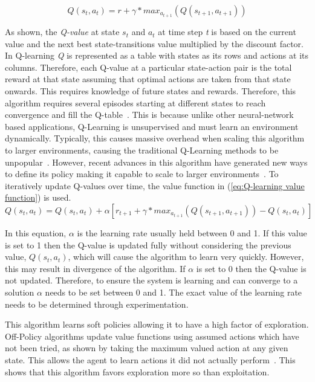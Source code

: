 \documentclass[12pt,american]{report}
\begin{document}
        \begin{equation}
            \label{eq:bellman}
            Q(s_{t},a_{t}) = r + \gamma*max_{a_{t+1} }(Q(s_{t+1},a_{t+1}))
        \end{equation}
        
        As shown, the \textit{Q-value} at state \textit{$s_t$} and \textit{$a_t$} at time step \textit{t} is based on the current value and the next best state-transitions value multiplied by the discount factor. In Q-learning \textit{Q} is represented as a table with states as its rows and actions at its columns.  Therefore, each Q-value at a particular state-action pair is the total reward at that state assuming that optimal actions are taken from that state onwards.  This requires knowledge of future states and rewards.  Therefore, this algorithm requires several episodes starting at different states to reach convergence and fill the Q-table~\cite{Watkins:1992}. This is because unlike other neural-network based applications, Q-Learning is unsupervised and must learn an environment dynamically. Typically, this causes massive overhead when scaling this algorithm to larger environments, causing the traditional Q-Learning methods to be unpopular~\cite{peng2015mobile}.  However, recent advances in this algorithm have generated new ways to define its policy making it capable to scale to larger environments~\cite{Greedy}. To iteratively update Q-values over time, the value function in (\ref{eq:Q-learning value function}) is used. 
        \begin{equation}
            \label{eq:Q-learning value function}
            Q(s_{t},a_{t}) = Q(s_{t},a_{t}) + \alpha[r_{t+1} + \gamma*max_{a_{t+1} }(Q(s_{t+1},a_{t+1}))-Q(s_{t},a_{t})]
        \end{equation}
        
        In this equation, \textit{$\alpha$} is the learning rate usually held between 0 and 1.  If this value is set to 1 then the Q-value is updated fully without considering the previous value, \textit{$Q(s_t,a_t)$}, which will cause the algorithm to learn very quickly. However, this may result in divergence of the algorithm.  If \textit{$\alpha$} is set to 0 then the Q-value is not updated.  Therefore, to ensure the system is learning and can converge to a solution \textit{$\alpha$} needs to be set between 0 and 1. The exact value of the learning rate needs to be determined through experimentation.
        
        This algorithm learns soft policies allowing it to have a high factor of exploration. Off-Policy algorithms update value functions using assumed actions which have not been tried, as shown by taking the maximum valued action at any given state.  This allows the agent to learn actions it did not actually perform~\cite{Eden}. This shows that this algorithm favors exploration more so than exploitation.  
        
\end{document}

